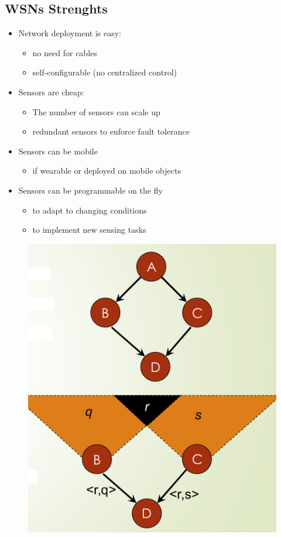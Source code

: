 \subsection{WSNs Strenghts}
\begin{paracol}{2}
   \begin{itemize}
      \item Network deployment is easy:
      \begin{itemize}
         \item no need for cables
         \item self-configurable (no centralized control)
   \end{itemize}
   \item Sensors are cheap:
   \begin{itemize}
      \item The number of sensors can scale up
      \item redundant sensors to enforce fault tolerance
   \end{itemize}
   \item Sensors can be mobile
   \begin{itemize}
      \item if wearable or deployed on mobile objects
   \end{itemize}
   \item Sensors can be programmable on the fly
   \begin{itemize}
      \item to adapt to changing conditions
      \item to implement new sensing tasks
   \end{itemize}
\end{itemize}
\switchcolumn
\begin{figure}[htbp]
   \centering
   \includegraphics{images/wsn_implosionoverlap.png}

\end{figure}
\end{paracol}
